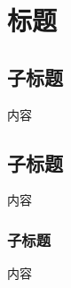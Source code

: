 \documentclass{article}
\begin{document}
\begin{titlepage}
\vspace*{140pt}
\vspace*{50pt}
\thispagestyle{empty}
\end{titlepage}

\tableofcontents
\clearpage

\section{标题}
\subsection{子标题}
内容
\subsection{子标题}
内容
\subsubsection{子标题}
内容
\end{document}
